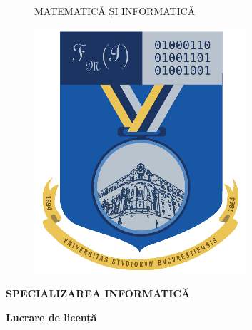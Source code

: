 \documentclass[12pt, a4paper]{report}
\begin{document}
\begin{titlepage}
\begin{figure}[!htb]
\begin{minipage}{0.5\textwidth}
\begin{center}
{                  MATEMATICĂ ȘI INFORMATICĂ
              }
          \end{center}
      \end{minipage}
      \begin{minipage}{0.2\textwidth}
          \includegraphics[width=\linewidth]{logo-fmi.png}
      \end{minipage}
  \end{figure}
  
  \begin{center}
  \textbf{SPECIALIZAREA INFORMATICĂ}
  \end{center}
  
  \vspace{1cm}
  
  \begin{center}
  \Large \textbf{Lucrare de licență}
  \end{center}
  
  \begin{center}
  \huge \textbf{\MakeUppercase{\@title}}
  \end{center}
  
  \vspace{3cm}
  

\end{titlepage}
\end{document}
